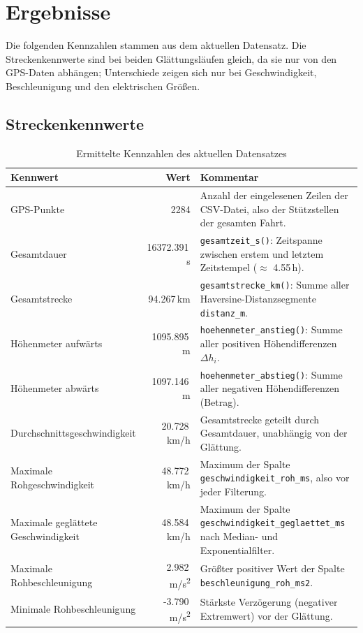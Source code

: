 \chapter{Ergebnisse}
\label{ch:ergebnisse}

Die folgenden Kennzahlen stammen aus dem aktuellen Datensatz. Die Streckenkennwerte sind bei beiden Glättungsläufen gleich, da sie nur von den GPS-Daten abhängen; Unterschiede zeigen sich nur bei Geschwindigkeit, Beschleunigung und den elektrischen Größen.

\section{Streckenkennwerte}

\begin{table}[htbp]
\centering
\caption{Ermittelte Kennzahlen des aktuellen Datensatzes}
\label{tab:streckenkennzahlen}
\begin{tabularx}{\textwidth}{@{}lrX@{}}
\toprule
Kennwert & Wert & Kommentar \\
\midrule
GPS-Punkte & 2284 & Anzahl der eingelesenen Zeilen der CSV-Datei, also der Stützstellen der gesamten Fahrt. \\
Gesamtdauer & 16372.391\,s & \texttt{gesamtzeit\_s()}: Zeitspanne zwischen erstem und letztem Zeitstempel ($\approx$ 4.55\,h). \\
Gesamtstrecke & 94.267\,km & \texttt{gesamtstrecke\_km()}: Summe aller Haversine-Distanzsegmente \texttt{distanz\_m}. \\
Höhenmeter aufwärts & 1095.895\,m & \texttt{hoehenmeter\_anstieg()}: Summe aller positiven Höhendifferenzen $\Delta h_i$. \\
Höhenmeter abwärts & 1097.146\,m & \texttt{hoehenmeter\_abstieg()}: Summe aller negativen Höhendifferenzen (Betrag). \\
Durchschnittsgeschwindigkeit & 20.728\,km/h & Gesamtstrecke geteilt durch Gesamtdauer, unabhängig von der Glättung. \\
Maximale Rohgeschwindigkeit & 48.772\,km/h & Maximum der Spalte \texttt{geschwindigkeit\_roh\_ms}, also vor jeder Filterung. \\
Maximale geglättete Geschwindigkeit & 48.584\,km/h & Maximum der Spalte \texttt{geschwindigkeit\_geglaettet\_ms} nach Median- und Exponentialfilter. \\
Maximale Rohbeschleunigung & 2.982\,m/s\textsuperscript{2} & Größter positiver Wert der Spalte \texttt{beschleunigung\_roh\_ms2}. \\
Minimale Rohbeschleunigung & -3.790\,m/s\textsuperscript{2} & Stärkste Verzögerung (negativer Extremwert) vor der Glättung. \\
\bottomrule
\end{tabularx}
\end{table}

